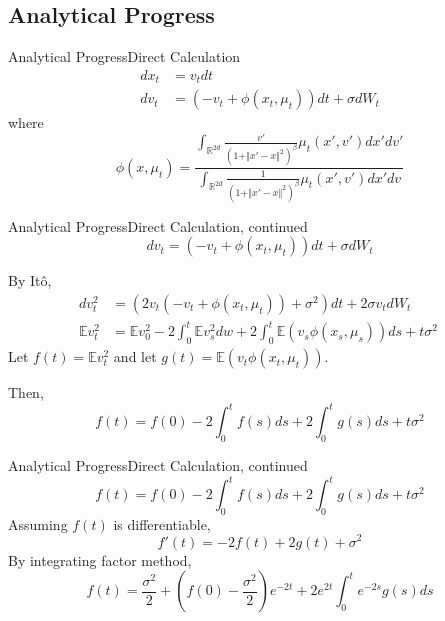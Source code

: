 \documentclass{beamer}
\begin{document}
\subsection{Analytical Progress}

\begin{frame}{Analytical Progress}{Direct Calculation}
	\begin{equation}
		\begin{split}
			dx_t&=v_tdt\\
			dv_t&=(-v_t+\phi(x_t,\mu_t))dt+\sigma dW_t
		\end{split}
	\end{equation}
	where
	\begin{equation}
		\phi (x,\mu_t)=\frac{\int_{\mathbb{R}^{2d}} \frac{v'}{(1+\Vert x'-x \Vert^2)^\beta}\mu_t(x',v')dx'dv'}{\int_{\mathbb{R}^{2d}} \frac{1}{(1+\Vert x'-x \Vert^2)^\beta}\mu_t(x',v')dx'dv}
	\end{equation}
\end{frame}

\begin{frame}{Analytical Progress}{Direct Calculation, continued}
	\begin{equation}
		dv_t=(-v_t+\phi(x_t,\mu_t))dt+\sigma dW_t
	\end{equation}

	By It\^{o},
		\begin{equation}
		\begin{split}
			dv_t^2&=(2v_t(-v_t+\phi(x_t,\mu_t))+\sigma^2)dt+2\sigma v_t dW_t \\
			\mathbb{E}v_t^2&=\mathbb{E}v_0^2-2\int_0^t \mathbb{E}v_s^2dw+2\int_0^t \mathbb{E}(v_s \phi(x_s,\mu_s))ds+t\sigma^2 \
		\end{split}
		\end{equation}
	Let $f(t)=\mathbb{E}v_t^2$ and let $g(t)=\mathbb{E}(v_t \phi(x_t,\mu_t))$.
	
	Then,
	\begin{equation}
	f(t)=f(0)-2 \int_0^t f(s)ds+2\int_0^t g(s)ds + t \sigma^2
	\end{equation}
\end{frame}

\begin{frame}{Analytical Progress}{Direct Calculation, continued}
	\begin{equation}
	f(t)=f(0)-2 \int_0^t f(s)ds+2\int_0^t g(s)ds + t \sigma^2
	\end{equation}
	Assuming $f(t)$ is differentiable,
	\begin{equation}
	f'(t)=-2f(t)+2g(t)+\sigma^2
	\end{equation}
	By integrating factor method,
	\begin{equation}
	f(t)=\frac{\sigma^2}{2}+\left(f(0)-\frac{\sigma^2}{2}\right)e^{-2t}+2e^{2t}\int_0^te^{-2s}g(s)ds
	\end{equation}
\end{frame}
\end{document}
